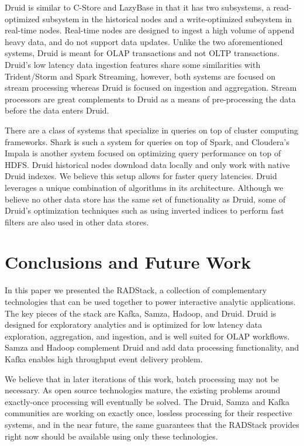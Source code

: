 \documentclass{vldb}
\begin{document}
{Druid is similar to C-Store\cite{stonebraker2005c} and
LazyBase\cite{cipar2012lazybase} in that it has two subsystems, a
read-optimized subsystem in the historical nodes and a write-optimized
subsystem in real-time nodes. Real-time nodes are designed to ingest a high
volume of append heavy data, and do not support data updates. Unlike the two
aforementioned systems, Druid is meant for OLAP transactions and not OLTP
transactions. Druid’s low latency data ingestion features share some
similarities with Trident/Storm\cite{marz2013storm} and Spark
Streaming\cite{zaharia2012discretized}, however, both systems are focused on
stream processing whereas Druid is focused on ingestion and aggregation. Stream
processors are great complements to Druid as a means of pre-processing the data
before the data enters Druid. 

There are a class of systems that specialize in queries on top of cluster
computing frameworks. Shark\cite{engle2012shark} is such a system for queries
on top of Spark, and Cloudera’s Impala\cite{cloudera2013} is another system
focused on optimizing query performance on top of HDFS. Druid historical nodes
download data locally and only work with native Druid indexes. We believe this
setup allows for faster query latencies. Druid leverages a unique combination
of algorithms in its architecture. Although we believe no other data store has
the same set of functionality as Druid, some of Druid’s optimization techniques
such as using inverted indices to perform fast filters are also used in other
data stores\cite{macnicol2004sybase}. 

\section{Conclusions and Future Work}
\label{sec:conclusions}
In this paper we presented the RADStack, a collection of complementary
technologies that can be used together to power interactive analytic
applications. The key pieces of the stack are Kafka, Samza, Hadoop, and Druid.
Druid is designed for exploratory analytics and is optimized for low latency
data exploration, aggregation, and ingestion, and is well suited for OLAP
workflows. Samza and Hadoop complement Druid and add data processing
functionality, and Kafka enables high throughput event delivery problem. 

We believe that in later iterations of this work, batch processing may not be
necessary. As open source technologies mature, the existing problems around
exactly-once processing will eventually be solved. The Druid, Samza and Kafka
communities are working on exactly once, lossless processing for their
respective systems, and in the near future, the same guarantees that the
RADStack provides right now should be available using only these technologies.

}
\end{document}
